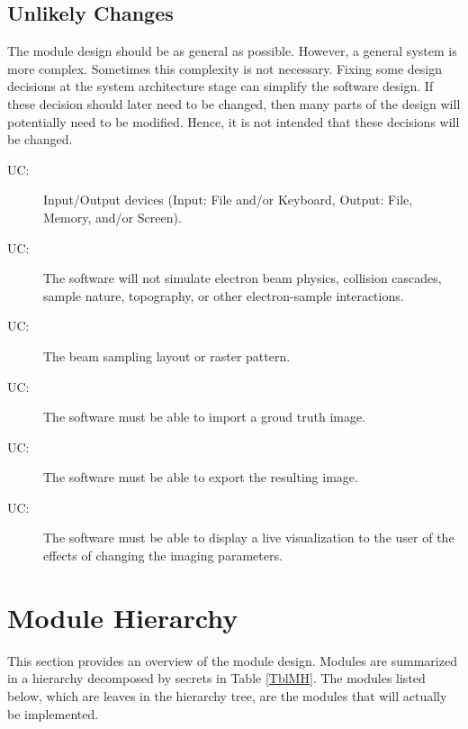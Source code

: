 \documentclass[12pt, titlepage]{article}
\newcounter{ucnum}
\newcommand{\uctheucnum}{UC\theucnum}
\begin{document}
\subsection{Unlikely Changes} \label{SecUchange}

The module design should be as general as possible. However, a general system is
more complex. Sometimes this complexity is not necessary. Fixing some design
decisions at the system architecture stage can simplify the software design. If
these decision should later need to be changed, then many parts of the design
will potentially need to be modified. Hence, it is not intended that these
decisions will be changed.

\begin{description}
  \item[ \uctheucnum \label{UC_IO}:] Input/Output devices
    (Input: File and/or Keyboard, Output: File, Memory, and/or Screen).
  \item[ \uctheucnum \label{UC_physics}:] The software will not
    simulate electron beam physics, collision cascades, sample nature, topography, 
    or other electron-sample interactions.
  \item[ \uctheucnum \label{UC_layout}:] The beam sampling
    layout or raster pattern.
  \item[ \uctheucnum \label{UC_import}:] The software must
    be able to import a groud truth image.
  \item[ \uctheucnum \label{UC_export}:] The software must
    be able to export the resulting image.
  \item[ \uctheucnum \label{UC_visualize}:] The software must be able
    to display a live visualization to the user of the effects of changing the imaging parameters.
\end{description}

\section{Module Hierarchy} \label{SecMH}

This section provides an overview of the module design. Modules are summarized
in a hierarchy decomposed by secrets in Table \ref{TblMH}. The modules listed
below, which are leaves in the hierarchy tree, are the modules that will
actually be implemented.
\end{document}
